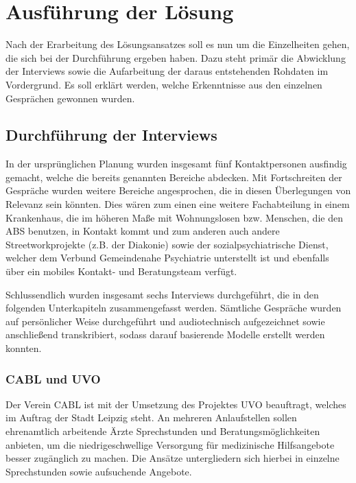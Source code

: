 \chapter{Ausführung der Lösung}\label{ch:solution}

Nach der Erarbeitung des Lösungsansatzes soll es nun um die Einzelheiten gehen, die sich bei der Durchführung ergeben haben. Dazu steht primär die Abwicklung der Interviews sowie die Aufarbeitung der daraus entstehenden Rohdaten im Vordergrund. Es soll erklärt werden, welche Erkenntnisse aus den einzelnen Gesprächen gewonnen wurden.

\section{Durchführung der Interviews}

In der ursprünglichen Planung wurden insgesamt fünf Kontaktpersonen ausfindig gemacht, welche die bereits genannten Bereiche abdecken. Mit Fortschreiten der Gespräche wurden weitere Bereiche angesprochen, die in diesen Überlegungen von Relevanz sein könnten. Dies wären zum einen eine weitere Fachabteilung in einem Krankenhaus, die im höheren Maße mit Wohnungslosen bzw. Menschen, die den \ac{ABS} benutzen, in Kontakt kommt und zum anderen auch andere Streetworkprojekte (z.B. der Diakonie) sowie der sozialpsychiatrische Dienst, welcher dem Verbund Gemeindenahe Psychiatrie unterstellt ist und ebenfalls über ein mobiles Kontakt- und Beratungsteam verfügt. 

Schlussendlich wurden insgesamt sechs Interviews durchgeführt, die in den folgenden Unterkapiteln zusammengefasst werden. Sämtliche Gespräche wurden auf persönlicher Weise durchgeführt und audiotechnisch aufgezeichnet sowie anschließend transkribiert, sodass darauf basierende Modelle erstellt werden konnten.

\subsection{CABL und UVO}

Der Verein \ac{CABL} ist mit der Umsetzung des Projektes \ac{UVO} beauftragt, welches im Auftrag der Stadt Leipzig steht. An mehreren Anlaufstellen sollen ehrenamtlich arbeitende Ärzte Sprechstunden und Beratungsmöglichkeiten anbieten, um die niedrigeschwellige Versorgung für medizinische Hilfsangebote besser zugänglich zu machen. Die Ansätze untergliedern sich hierbei in einzelne Sprechstunden sowie aufsuchende Angebote.

